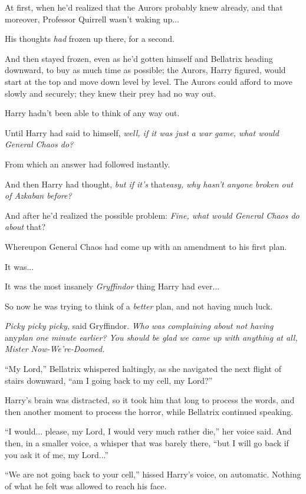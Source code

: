At first, when he'd realized that the Aurors probably knew already, and
that moreover, Professor Quirrell wasn't waking up...

His thoughts \emph{had} frozen up there, for a second.

And then stayed frozen, even as he'd gotten himself and Bellatrix
heading downward, to buy as much time as possible; the Aurors, Harry
figured, would start at the top and move down level by level. The Aurors
could afford to move slowly and securely; they knew their prey had no
way out.

Harry hadn't been able to think of any way out.

Until Harry had said to himself, \emph{well, if it was just a war game,
what would General Chaos do?}

From which an answer had followed instantly.

And then Harry had thought, \emph{but if it's} that\emph{easy, why
hasn't anyone broken out of Azkaban before?}

And after he'd realized the possible problem: \emph{Fine, what would
General Chaos do about} that?

Whereupon General Chaos had come up with an amendment to his first plan.

It was...

It was the most insanely \emph{Gryffindor} thing Harry had ever...

So now he was trying to think of a \emph{better} plan, and not having
much luck.

\emph{Picky picky picky,} said Gryffindor. \emph{Who was complaining
about not having} any\emph{plan one minute earlier? You should be glad
we came up with anything at all, Mister Now-We're-Doomed.}

``My Lord,'' Bellatrix whispered haltingly, as she navigated the next
flight of stairs downward, ``am I going back to my cell, my Lord?''

Harry's brain was distracted, so it took him that long to process the
words, and then another moment to process the horror, while Bellatrix
continued speaking.

``I would... please, my Lord, I would very much rather die,'' her
voice said. And then, in a smaller voice, a whisper that was barely
there, ``but I will go back if you ask it of me, my Lord...''

``We are not going back to your cell,'' hissed Harry's voice, on
automatic. Nothing of what he felt was allowed to reach his face.


